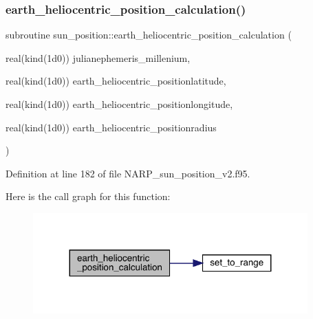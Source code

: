 \mbox{\label{_n_a_r_p__sun__position__v2_8f95_a92e554f1813215c40dce31d2ce961649}} 
\subsubsection{\texorpdfstring{earth\+\_\+heliocentric\+\_\+position\+\_\+calculation()}{earth\_heliocentric\_position\_calculation()}}
{\footnotesize\ttfamily subroutine sun\+\_\+position\+::earth\+\_\+heliocentric\+\_\+position\+\_\+calculation (\begin{DoxyParamCaption}\item[{real(kind(1d0))}]{julianephemeris\+\_\+millenium,  }\item[{real(kind(1d0))}]{earth\+\_\+heliocentric\+\_\+positionlatitude,  }\item[{real(kind(1d0))}]{earth\+\_\+heliocentric\+\_\+positionlongitude,  }\item[{real(kind(1d0))}]{earth\+\_\+heliocentric\+\_\+positionradius }\end{DoxyParamCaption})}



Definition at line 182 of file N\+A\+R\+P\+\_\+sun\+\_\+position\+\_\+v2.\+f95.

Here is the call graph for this function\+:\nopagebreak
\begin{figure}[H]
\begin{center}
\leavevmode
\includegraphics[width=299pt]{_n_a_r_p__sun__position__v2_8f95_a92e554f1813215c40dce31d2ce961649_cgraph}
\end{center}
\end{figure}
\mbox{\label{_n_a_r_p__sun__position__v2_8f95_abca94c8e1d4fac1a6f3d41cb0f89157f}} 
